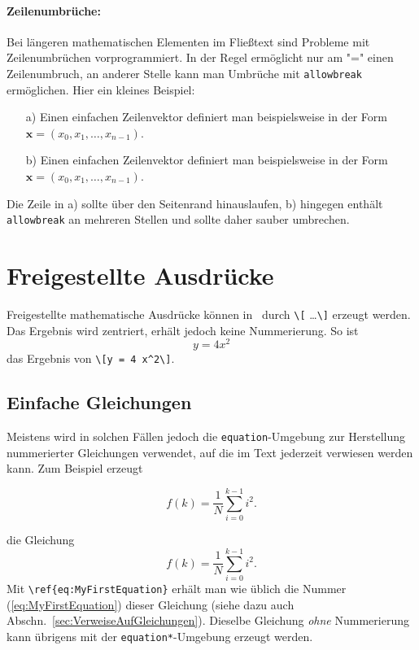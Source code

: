 \paragraph{Zeilenumbrüche:}
Bei längeren mathematischen Elementen im Fließtext sind Probleme mit Zeilenumbrüchen
vorprogrammiert. In der Regel ermöglicht \latex nur am "=" einen Zeilenumbruch,
an anderer Stelle kann man Umbrüche mit \texttt{{\bs}allowbreak} ermöglichen. 
Hier ein kleines Beispiel:
%
\begin{itemize}
\item[a)] Einen einfachen Zeilenvektor definiert man beispielsweise in der Form 
		$\boldsymbol{x} = (x_0, x_1, \ldots, x_{n-1})$.
\item[b)] Einen einfachen Zeilenvektor definiert man beispielsweise in der Form 
	$\boldsymbol{x} = (x_0,\allowbreak x_1,\allowbreak\ldots,\allowbreak x_{n-1})$.
\end{itemize}
Die Zeile in a) sollte über den Seitenrand hinauslaufen, b) hingegen enthält
\texttt{{\bs}allowbreak} an mehreren Stellen und sollte daher sauber umbrechen.


\section{Freigestellte Ausdrücke}

Freigestellte mathematische Ausdrücke können in \latex\ durch \verb!\[! \ldots \verb!\]!
erzeugt werden. Das Ergebnis wird zentriert, erhält jedoch keine 
Nummerierung. So ist \zB\ \[y = 4 x^2\] das Ergebnis von \verb!\[y = 4 x^2\]!.


\subsection{Einfache Gleichungen} 

Meistens wird in solchen Fällen jedoch die \texttt{equation}-Umgebung zur Herstellung nummerierter 
Gleichungen verwendet, auf die im Text jederzeit verwiesen werden kann. Zum Beispiel erzeugt
%
\begin{LaTeXCode}[numbers=none]
\begin{equation}
  f(k) = \frac{1}{N} \sum_{i=0}^{k-1} i^2 . 
  \label{eq:MyFirstEquation}
\end{equation}
\end{LaTeXCode}
%
die Gleichung
%
\begin{equation}
  f(k) = \frac{1}{N} \sum_{i=0}^{k-1} i^2 . 
\label{eq:MyFirstEquation}
\end{equation}
%
Mit \verb!\ref{eq:MyFirstEquation}! erhält man wie üblich die Nummer (\ref{eq:MyFirstEquation}) dieser Gleichung (siehe dazu auch Abschn.\ \ref{sec:VerweiseAufGleichungen}). 
Dieselbe Gleichung \emph{ohne} Nummerierung kann übrigens mit der \texttt{equation*}-Umgebung erzeugt werden.

